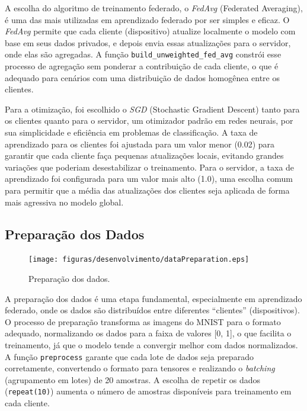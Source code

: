 A escolha do algoritmo de treinamento federado, o \textit{FedAvg} (Federated Averaging), é uma das mais utilizadas em aprendizado federado por ser simples e eficaz. O \textit{FedAvg} permite que cada cliente (dispositivo) atualize localmente o modelo com base em seus dados privados, e depois envia essas atualizações para o servidor, onde elas são agregadas. A função \texttt{build\_unweighted\_fed\_avg} constrói esse processo de agregação sem ponderar a contribuição de cada cliente, o que é adequado para cenários com uma distribuição de dados homogênea entre os clientes. 

Para a otimização, foi escolhido o \textit{SGD} (Stochastic Gradient Descent) tanto para os clientes quanto para o servidor, um otimizador padrão em redes neurais, por sua simplicidade e eficiência em problemas de classificação. A taxa de aprendizado para os clientes foi ajustada para um valor menor (0.02) para garantir que cada cliente faça pequenas atualizações locais, evitando grandes variações que poderiam desestabilizar o treinamento. Para o servidor, a taxa de aprendizado foi configurada para um valor mais alto (1.0), uma escolha comum para permitir que a média das atualizações dos clientes seja aplicada de forma mais agressiva no modelo global.

\subsection{Preparação dos Dados}

\begin{figure}[ht]
    \centering
    \texttt{[image: figuras/desenvolvimento/dataPreparation.eps]}
    \caption{Preparação dos dados.}
    \label{fig:dataPreparation}
\end{figure}

A preparação dos dados é uma etapa fundamental, especialmente em aprendizado federado, onde os dados são distribuídos entre diferentes ``clientes'' (dispositivos). O processo de preparação transforma as imagens do MNIST para o formato adequado, normalizando os dados para a faixa de valores [0, 1], o que facilita o treinamento, já que o modelo tende a convergir melhor com dados normalizados. A função \texttt{preprocess} garante que cada lote de dados seja preparado corretamente, convertendo o formato para tensores e realizando o \textit{batching} (agrupamento em lotes) de 20 amostras. A escolha de repetir os dados (\texttt{repeat(10)}) aumenta o número de amostras disponíveis para treinamento em cada cliente. 

